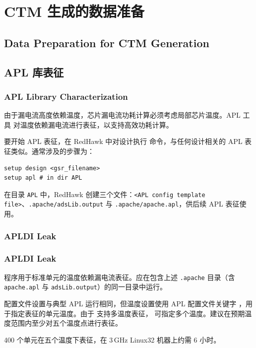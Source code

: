 \section{CTM 生成的数据准备}
\subsection*{Data Preparation for CTM Generation}

\subsection{APL 库表征}
\subsubsection*{APL Library Characterization}

由于漏电流高度依赖温度，芯片漏电流功耗计算必须考虑局部芯片温度。APL 工具  对温度依赖漏电流进行表征，以支持高效功耗计算。

要开始 APL 表征，在 RedHawk 中对设计执行  命令，与任何设计相关的 APL 表征类似。通常涉及的步骤为：
\begin{lstlisting}
setup design <gsr_filename>
setup apl # in dir APL
\end{lstlisting}

在目录 \texttt{APL} 中，RedHawk 创建三个文件：\texttt{<APL config template file>}、\texttt{.apache/adsLib.output} 与 \texttt{.apache/apache.apl}，供后续 APL 表征使用。

\subsubsection{APLDI Leak}
\subsubsection*{APLDI Leak}

 程序用于标准单元的温度依赖漏电流表征。应在包含上述 \texttt{.apache} 目录（含 \texttt{apache.apl} 与 \texttt{adsLib.output}）的同一目录中运行。

配置文件设置与典型 APL 运行相同，但温度设置使用 APL 配置文件关键字 ，用于指定表征的单元温度。由于  支持多温度表征， 可指定多个温度。建议在预期温度范围内至少对五个温度点进行表征。

\begin{noteBox}
400 个单元在五个温度下表征，在 3\,GHz Linux32 机器上约需 6 小时。
\end{noteBox}

